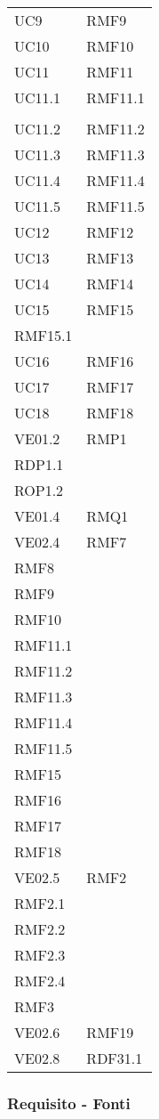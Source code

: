 \begin{longtable}[h!] { >{\centering}m{5cm} >{\centering}m{5cm} }
	 \tabularnewline
	 UC9 & RMF9
	 \tabularnewline
	 UC10 & RMF10
	 \tabularnewline
	 UC11 & RMF11
	 \tabularnewline
	 UC11.1 & RMF11.1 \\
	 \tabularnewline
	 UC11.2 & RMF11.2
	 \tabularnewline
	 UC11.3 & RMF11.3
	 \tabularnewline
	 UC11.4 & RMF11.4
	 \tabularnewline
	 UC11.5 & RMF11.5
	 \tabularnewline
	 UC12 & RMF12
	 \tabularnewline
	 UC13 & RMF13
	 \tabularnewline
	 UC14 & RMF14
	 \tabularnewline
	 UC15 & RMF15 \\
	 RMF15.1
	 \tabularnewline
	 UC16 & RMF16
	 \tabularnewline
	 UC17 & RMF17
	 \tabularnewline
	 UC18 & RMF18
	 \tabularnewline
	 VE01.2 & RMP1 \\
	 RDP1.1 \\
	 ROP1.2
	 \tabularnewline
	 VE01.4 & RMQ1
	 \tabularnewline
	 VE02.4 & RMF7\\
	 RMF8 \\
	 RMF9 \\
	 RMF10 \\
	 RMF11.1 \\
	 RMF11.2 \\
	 RMF11.3 \\
	 RMF11.4 \\
	 RMF11.5 \\
	 RMF15 \\
	 RMF16 \\
	 RMF17 \\
	 RMF18
	 \tabularnewline
	 VE02.5 & RMF2 \\
	 RMF2.1 \\
	 RMF2.2 \\
	 RMF2.3 \\
	 RMF2.4 \\
	 RMF3
	 \tabularnewline
	 VE02.6 & RMF19
	 \tabularnewline
	 VE02.8 & RDF31.1
	 \tabularnewline

\end{longtable}

\newpage

\subsubsection{Requisito - Fonti}

